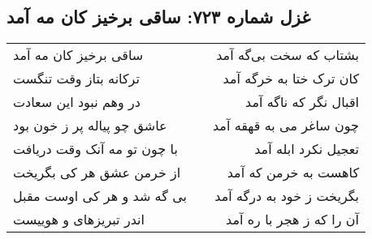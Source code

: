 \begin{center}
\section*{غزل شماره ۷۲۳: ساقی برخیز کان مه آمد}
\label{sec:0723}
\begin{longtable}{l p{0.5cm} r}
ساقی برخیز کان مه آمد
&&
بشتاب که سخت بی‌گه آمد
\\
ترکانه بتاز وقت تنگست
&&
کان ترک ختا به خرگه آمد
\\
در وهم نبود این سعادت
&&
اقبال نگر که ناگه آمد
\\
عاشق چو پیاله پر ز خون بود
&&
چون ساغر می به قهقه آمد
\\
با چون تو مه آنک وقت دریافت
&&
تعجیل نکرد ابله آمد
\\
از خرمن عشق هر کی بگریخت
&&
کاهست به خرمن که آمد
\\
بی گه شد و هر کی اوست مقبل
&&
بگریخت ز خود به درگه آمد
\\
اندر تبریزهای و هوییست
&&
آن را که ز هجر با ره آمد
\\
\end{longtable}
\end{center}
